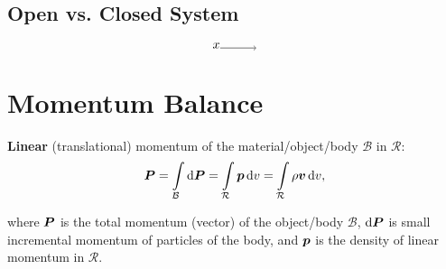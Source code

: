 \subsection{Open vs. Closed System}



\[
  x
    \begin{tikzpicture}%
      \draw[->] (0, 0) -- (1, 0);
    \end{tikzpicture}
\]


\section{Momentum Balance}



\begin{definition}
  \textbf{Linear} (translational) momentum of the material/object/body \(\mathcal{B}\) in \(\mathcal{R}\):
%
\begin{equation}
  \bm{P} = \int\limits_\mathcal{B} \mathop{}\!\mathrm{d} \bm{P} = \int\limits_\mathcal{R} \bm{p} \mathop{}\!\mathrm{d} v = \int\limits_\mathcal{R} \rho \bm{v} \mathop{}\!\mathrm{d} v,
\end{equation}
%
\end{definition}
\noindent where \(\bm{P}\) is the total momentum (vector) of the object/body \(\mathcal{B}\), \(\mathop{}\!\mathrm{d} \bm{P}\) is small incremental momentum of particles of the body, and \(\bm{p}\) is the density of linear momentum in \(\mathcal{R}\).

